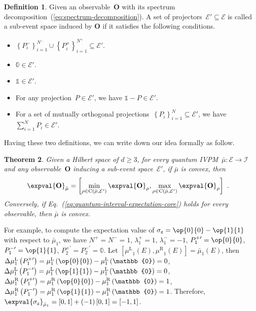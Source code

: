 \documentclass[english,reprint, aps, prl,superscriptaddress, showpacs,
showkeys, longbibliography, amsmath, amssymb]{revtex4-1}
\theoremstyle{plain}
\newtheorem{thm}{Theorem}
\theoremstyle{definition}
\newtheorem{definition}[thm]{Definition}
\newcommand{\events}{\ensuremath{\mathcal{E}}}
\newcommand{\proj}[1]{\op{#1}{#1}}
\newcommand{\coreBorn}{\ensuremath{\mathrm{C}}}
\newcommand{\mul}{\ensuremath{\mu^{\mathrm{L}}}}
\newcommand{\mur}{\ensuremath{\mu^{\mathrm{R}}}}
\begin{document}
\begin{definition}Given an observable~$\mathbf{O}$ with its spectrum
decomposition~(\ref{eq:spectrum-decomposition}). A set of projectors~$\events'\subseteq\events$
is called a sub-event space induced by $\mathbf{O}$ if it satisfies
the following conditions.
\begin{itemize}
\item $\left\{ P_{i}^{-}\right\} _{i=1}^{N^{-}}\cup\left\{ P_{i}^{+}\right\} _{i=1}^{N^{+}}\subseteq\events'$.
\item $\mathbb{0}\in\events'$. 
\item $\mathbb{1}\in\events'$. 
\item For any projection~$P\in\events'$, we have $\mathbb{1}-P\in\events'$. 
\item For a set of mutually orthogonal projections~$\left\{ P_{i}\right\} _{i=1}^{N}\subseteq\events'$,
we have $\sum_{i=1}^{N}P_{i}\in\events'$. 
\end{itemize}
\end{definition}

\noindent Having these two definitions, we can write down our idea
formally as follow.

\begin{thm}Given a Hilbert space of $d\ge3$, for every quantum IVPM~$\bar{\mu}:\events\rightarrow\mathscr{I}$
and any observable~$\mathbf{O}$ inducing a sub-event space~$\events'$,
if $\bar{\mu}$ is convex, then
\begin{equation}
\expval{\mathbf{O}}_{\bar{\mu}}=\left[\min_{\rho\in\coreBorn\left(\bar{\mu},\events'\right)}\expval{\mathbf{O}}_{\rho},\max_{\rho\in\coreBorn\left(\bar{\mu},\events'\right)}\expval{\mathbf{O}}_{\rho}\right]\textrm{ .}\label{eq:quantum-interval-expectation-core}
\end{equation}
Conversely, if Eq.~(\ref{eq:quantum-interval-expectation-core})
holds for every observable, then $\bar{\mu}$ is convex.\end{thm}

For example, to compute the expectation value of $\sigma_{\mathrm{z}}=\proj{0}-\proj{1}$
with respect to $\bar{\mu}_{1}$, we have $N^{+}=N^{-}=1$, $\lambda_{1}^{+}=1$,
$\lambda_{1}^{-}=-1$, $P_{1}^{+\prime}=\proj{0}$, $P_{1}^{-\prime}=\proj{1}$,
$P_{2}^{+\prime}=P_{2}^{-\prime}=\mathbb{0}$. Let $\left[\mul_{1}\left(E\right),\mur_{1}\left(E\right)\right]=\bar{\mu}_{1}\left(E\right)$,
then $\Delta\mul_{1}\left(P_{1}^{+\prime}\right)=\mul_{1}\left(\proj{0}\right)-\mul_{1}\left(\mathbb{0}\right)=0$,
$\Delta\mul_{1}\left(P_{1}^{-\prime}\right)=\mul_{1}\left(\proj{1}\right)-\mul_{1}\left(\mathbb{0}\right)=0$,
$\Delta\mur_{1}\left(P_{1}^{+\prime}\right)=\mur_{1}\left(\proj{0}\right)-\mur_{1}\left(\mathbb{0}\right)=1$,
$\Delta\mur_{1}\left(P_{1}^{-\prime}\right)=\mur_{1}\left(\proj{1}\right)-\mur_{1}\left(\mathbb{0}\right)=1$.
Therefore, $\expval{\sigma_{\mathrm{z}}}_{\bar{\mu}_{1}}=\left[0,1\right]+\left(-1\right)\left[0,1\right]=\left[-1,1\right]$.
\end{document}
